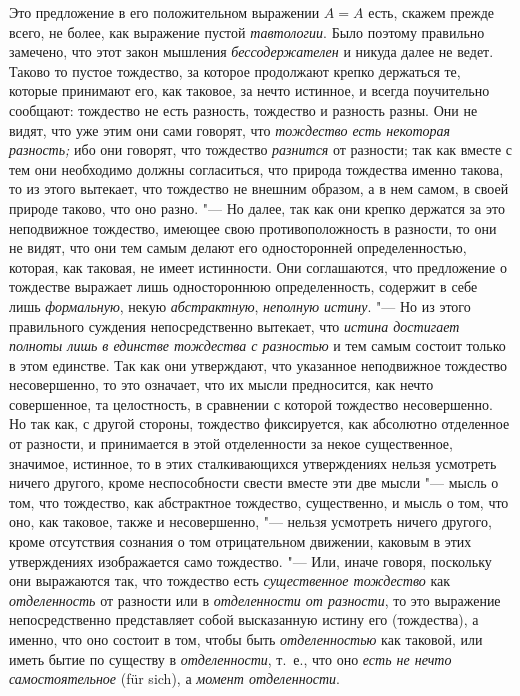 Это предложение в его положительном выражении $A=A$ есть,
скажем прежде всего, не более, как выражение пустой
{\em тавтологии}. Было поэтому правильно замечено, что
этот закон мышления {\em бессодержателен} и никуда
далее не ведет. Таково то пустое тождество, за которое продолжают крепко
держаться те, которые принимают его, как таковое, за нечто истинное, и
всегда поучительно сообщают: тождество не есть разность, тождество и
разность разны. Они не видят, что уже этим они сами говорят, что
{\em тождество есть некоторая разность;} ибо они
говорят, что тождество {\em разнится} от разности; так
как вместе с тем они необходимо должны согласиться, что природа тождества
именно такова, то из этого вытекает, что тождество не внешним образом, а в
нем самом, в своей природе таково, что оно разно. "--- Но далее, так как они
крепко держатся за это неподвижное тождество, имеющее свою
противоположность в разности, то они не видят, что они тем самым делают его
односторонней определенностью, которая, как таковая, не имеет истинности.
Они соглашаются, что предложение о тождестве выражает лишь одностороннюю
определенность, содержит в себе лишь {\em формальную},
некую {\em абстрактную},
{\em неполную истину}. "--- Но из этого правильного
суждения непосредственно вытекает, что {\em истина
достигает полноты лишь в единстве тождества с разностью} и тем самым
состоит только в этом единстве. Так как они утверждают, что указанное
неподвижное тождество несовершенно, то это означает, что их мысли
предносится, как нечто совершенное, та целостность, в сравнении с которой
тождество несовершенно. Но так как, с другой стороны, тождество
фиксируется, как абсолютно отделенное от разности, и принимается в этой
отделенности за некое существенное, значимое, истинное, то в этих
сталкивающихся утверждениях нельзя усмотреть ничего другого, кроме
неспособности свести вместе эти две мысли "--- мысль о том, что тождество, как
абстрактное тождество, существенно, и мысль о том, что оно, как таковое,
также и несовершенно, "--- нельзя усмотреть ничего другого, кроме отсутствия
сознания о том отрицательном движении, каковым в этих утверждениях
изображается само тождество. "--- Или, иначе говоря, поскольку они выражаются
так, что тождество есть {\em существенное тождество}
как {\em отделенность} от разности или в
{\em отделенности от разности}, то это выражение
непосредственно представляет собой высказанную истину его (тождества), а
именно, что оно состоит в том, чтобы быть
{\em отделенностью} как таковой, или иметь бытие по
существу в {\em отделенности}, т.~е., что оно
{\em есть не нечто самостоятельное} (für sich), а
{\em момент отделенности}.

